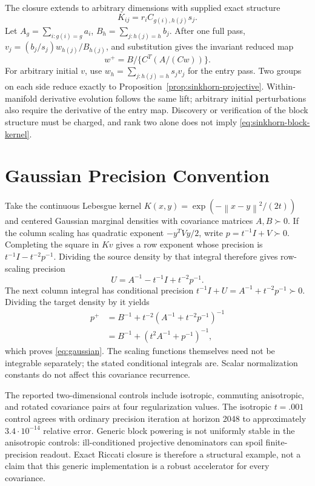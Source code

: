 \documentclass[journal]{IEEEtran}
\theoremstyle{definition}
\newcommand{\norm}[1]{\left\lVert#1\right\rVert}
\begin{document}
The closure extends to arbitrary dimensions with supplied exact structure
\begin{equation}
 K_{ij}=r_i C_{g(i),h(j)}s_j.
 \label{eq:sinkhorn-block-kernel}
\end{equation}
Let $A_g=\sum_{i:g(i)=g}a_i$, $B_h=\sum_{j:h(j)=h}b_j$.
After one full pass, $v_j=(b_j/s_j)w_{h(j)}/B_{h(j)}$, and substitution
gives the invariant reduced map
\begin{equation}
 w^+=B\big/\{C^T(A/(Cw))\}.
 \label{eq:sinkhorn-block-map}
\end{equation}
For arbitrary initial $v$, use $w_h=\sum_{j:h(j)=h}s_jv_j$ for the entry
pass. Two groups on each side reduce exactly to
Proposition~\ref{prop:sinkhorn-projective}. Within-manifold derivative
evolution follows the same lift; arbitrary initial perturbations also
require the derivative of the entry map. Discovery or verification of the
block structure must be charged, and rank two alone does not imply
\eqref{eq:sinkhorn-block-kernel}.


\section{Gaussian Precision Convention}\label{app:gaussian}
Take the continuous Lebesgue kernel
$K(x,y)=\exp(-\norm{x-y}^2/(2t))$ and centered Gaussian marginal
densities with covariance matrices $A,B\succ0$. If the column scaling has
quadratic exponent $-y^TVy/2$, write $p=t^{-1}I+V\succ0$.
Completing the square in $Kv$ gives a row exponent whose precision is
$t^{-1}I-t^{-2}p^{-1}$. Dividing the source density by that integral
therefore gives row-scaling precision
\[
 U=A^{-1}-t^{-1}I+t^{-2}p^{-1}.
\]
The next column integral has conditional precision
$t^{-1}I+U=A^{-1}+t^{-2}p^{-1}\succ0$.
Dividing the target density by it yields
\begin{align*}
 p^+&=B^{-1}+t^{-2}(A^{-1}+t^{-2}p^{-1})^{-1}\\
    &=B^{-1}+(t^2A^{-1}+p^{-1})^{-1},
\end{align*}
which proves \eqref{eq:gaussian}. The scaling functions themselves need
not be integrable separately; the stated conditional integrals are.
Scalar normalization constants do not affect this covariance recurrence.

The reported two-dimensional controls include isotropic, commuting
anisotropic, and rotated covariance pairs at four regularization values.
The isotropic $t=.001$ control agrees with ordinary precision iteration
at horizon 2048 to approximately $3.4\cdot10^{-14}$ relative error.
Generic block powering is not uniformly stable in the anisotropic controls:
ill-conditioned projective denominators can spoil finite-precision readout.
Exact Riccati closure is therefore a structural example, not a claim that
this generic implementation is a robust accelerator for every covariance.
\end{document}
